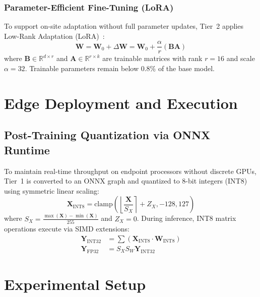 \documentclass[10pt,journal,compsoc]{IEEEtran}
\begin{document}
\subsubsection{Parameter-Efficient Fine-Tuning (LoRA)}
To support on-site adaptation without full parameter updates, Tier~2 applies Low-Rank Adaptation (LoRA)~\cite{hu2022lora}:
\begin{equation}
\mathbf{W} = \mathbf{W}_0 + \Delta \mathbf{W} = \mathbf{W}_0 + \frac{\alpha}{r} (\mathbf{B} \mathbf{A})
\end{equation}
where $\mathbf{B} \in \mathbb{R}^{d \times r}$ and $\mathbf{A} \in \mathbb{R}^{r \times k}$ are trainable matrices with rank $r=16$ and scale $\alpha=32$. Trainable parameters remain below 0.8\% of the base model.

\section{Edge Deployment and Execution}
\subsection{Post-Training Quantization via ONNX Runtime}
To maintain real-time throughput on endpoint processors without discrete GPUs, Tier~1 is converted to an ONNX graph and quantized to 8-bit integers (INT8) using symmetric linear scaling:
\begin{equation}
\mathbf{X}_{\text{INT8}} = \text{clamp}\left( \left\lfloor \frac{\mathbf{X}}{S_X} \right\rceil + Z_X, -128, 127 \right)
\end{equation}
where $S_X = \frac{\max(\mathbf{X}) - \min(\mathbf{X})}{255}$ and $Z_X = 0$. During inference, INT8 matrix operations execute via SIMD extensions:
\begin{align}
\mathbf{Y}_{\text{INT32}} &= \sum (\mathbf{X}_{\text{INT8}} \cdot \mathbf{W}_{\text{INT8}}) \\
\mathbf{Y}_{\text{FP32}} &= S_X S_W \mathbf{Y}_{\text{INT32}}
\end{align}

\section{Experimental Setup}
\end{document}
